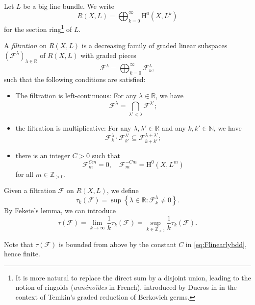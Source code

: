 \begin{definition}\label{def:testcurve:L1134}
    Let $L$ be a big line bundle. We write
    \[
    R(X,L)=\bigoplus_{k=0}^{\infty} \mathrm{H}^0(X,L^k)
    \]
    for the section ring\footnote{It is more natural to replace the direct sum by a disjoint union, leading to the notion of ringoids (\emph{annénoïdes} in French), introduced by Ducros in \cite{Duc21} in the context of Temkin's graded reduction of Berkovich germs.} of $L$.

    A \emph{filtration} on $R(X,L)$ is a decreasing family of graded linear subspaces $(\mathcal{F}^{\lambda})_{\lambda\in \mathbb{R}}$ of $R(X,L)$ with graded pieces
    \[
    \mathcal{F}^{\lambda}=\bigoplus_{k=0}^{\infty} \mathcal{F}^{\lambda}_k,
    \]
    such that the following conditions are satisfied:
    \begin{itemize}
        \item The filtration is left-continuous: For any $\lambda\in \mathbb{R}$, we have
        \[
        \mathcal{F}^{\lambda}=\bigcap_{\lambda'<\lambda}\mathcal{F}^{\lambda'};
        \]
        \item the filtration is multiplicative: For any $\lambda,\lambda'\in \mathbb{R}$ and any $k,k'\in \mathbb{N}$, we have
        \[
        \mathcal{F}^{\lambda}_k\cdot \mathcal{F}^{\lambda'}_{k'}\subseteq \mathcal{F}^{\lambda+\lambda'}_{k+k'};
        \]
        \item there is an integer $C>0$ such that
        \begin{equation}\label{eq:Flinearlybdd}
        \mathcal{F}^{Cm}_{m}=0,\quad \mathcal{F}^{-Cm}_m=\mathrm{H}^0(X,L^m)
        \end{equation}
        for all $m\in \mathbb{Z}_{>0}$.
    \end{itemize}

    Given a filtration $\mathcal{F}$ on $R(X,L)$, we define
    \[
    \tau_k(\mathcal{F})=\sup\left\{\lambda\in \mathbb{R}: \mathcal{F}^{\lambda}_k\neq 0\right\}.
    \]
    By Fekete's lemma, we can introduce
    \[
    \tau(\mathcal{F})=\lim_{k\to\infty}\frac{1}{k}\tau_k(\mathcal{F})=\sup_{k\in \mathbb{Z}_{>0}}\frac{1}{k}\tau_k(\mathcal{F}).
    \]
\end{definition}
Note that $\tau(\mathcal{F})$ is bounded from above by the constant $C$ in \eqref{eq:Flinearlybdd}, hence finite.



